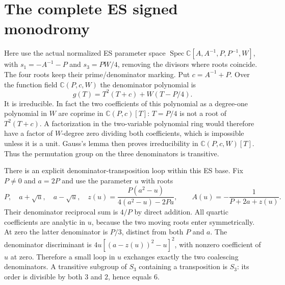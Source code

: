 \documentclass[11pt]{article}
\newcommand{\C}{\mathbb C}\newcommand{\diag}{\operatorname{diag}}
\begin{document}
\section{The complete ES signed monodromy}
Here use the actual normalized ES parameter space
$\operatorname{Spec}\C[A,A^{-1},P,P^{-1},W]$, with
$s_1=-A^{-1}-P$ and $s_3=PW/4$, removing the divisors where roots
coincide. The four roots keep their prime/denominator marking. Put
$c=A^{-1}+P$. Over the function field $\C(P,c,W)$ the denominator
polynomial is
\begin{equation}
 g(T)=T^2(T+c)+W(T-P/4).
 \tag{ECC46}
\end{equation}
It is irreducible. In fact the two coefficients of this polynomial as
a degree-one polynomial in $W$ are coprime in $\C(P,c)[T]$:
$T=P/4$ is not a root of $T^2(T+c)$. A factorization in the two-variable
polynomial ring would therefore have a factor of $W$-degree zero
dividing both coefficients, which is impossible unless it is a unit.
Gauss's lemma then proves irreducibility in $\C(P,c,W)[T]$. Thus the
permutation group on the three denominators is transitive.

There is an explicit denominator-transposition loop within this ES
base. Fix $P\ne0$ and $a=2P$ and use the parameter $u$ with roots
\begin{equation}
 P,\quad a+\sqrt u,\quad a-\sqrt u,\quad
 z(u)=\frac{P(a^2-u)}{4(a^2-u)-2Pa},\qquad
 A(u)=-\frac1{P+2a+z(u)}.
 \tag{ECC47}
\end{equation}
Their denominator reciprocal sum is $4/P$ by direct addition. All
quartic coefficients are analytic in $u$, because the two moving roots
enter symmetrically. At zero the latter denominator is $P/3$, distinct
from both $P$ and $a$. The denominator discriminant is
$4u[(a-z(u))^2-u]^2$, with nonzero coefficient of $u$ at zero. Therefore
a small loop in $u$ exchanges exactly the two coalescing denominators.
A transitive subgroup of $S_3$ containing a transposition is $S_3$:
its order is divisible by both $3$ and $2$, hence equals $6$.
\end{document}
